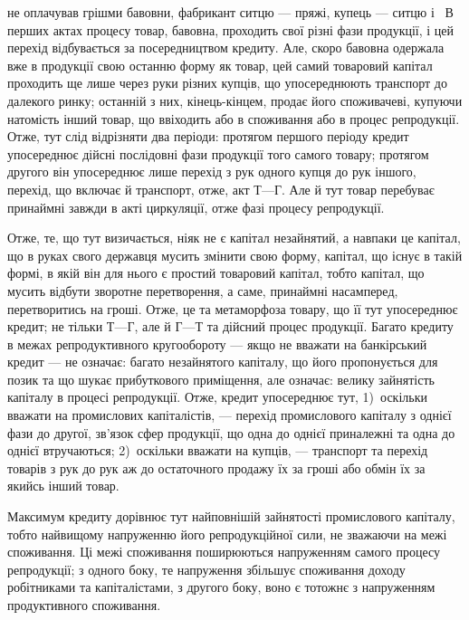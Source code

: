 \parcont{}  %
не оплачував грішми бавовни, фабрикант ситцю — пряжі, купець — ситцю і~
В перших актах процесу товар, бавовна, проходить свої різні фази продукції, і цей
перехід відбувається за посередництвом кредиту. Але, скоро бавовна одержала
вже в продукції свою останню форму як товар, цей самий товаровий капітал
проходить ще лише через руки різних купців, що упосереднюють транспорт до
далекого ринку; останній з них, кінець-кінцем, продає його споживачеві,
купуючи натомість інший товар, що ввіходить або в споживання або в процес
репродукції. Отже, тут слід відрізняти два періоди: протягом першого періоду
кредит упосереднює дійсні послідовні фази продукції того самого товару; протягом
другого він упосереднює лише перехід з рук одного купця до рук іншого, перехід,
що включає й транспорт, отже, акт $Т — Г$. Але й тут товар перебуває принаймні
завжди в акті циркуляції, отже фазі процесу репродукції.

Отже, те, що тут визичається, ніяк не є капітал незайнятий, а навпаки це
капітал, що в руках свого державця мусить змінити свою форму, капітал, що
існує в такій формі, в якій він для нього є простий товаровий капітал, тобто
капітал, що мусить відбути зворотне перетворення, а саме, принаймні насамперед,
перетворитись на гроші. Отже, це та метаморфоза товару, що її тут упосереднює
кредит; не тільки $Т — Г$, але й $Г — Т$ та дійсний процес продукції.
Багато кредиту в межах репродуктивного кругообороту — якщо не вважати на банкірський
кредит — не означає: багато незайнятого капіталу, що його пропонується
для позик та що шукає прибуткового приміщення, але означає: велику
зайнятість капіталу в процесі репродукції. Отже, кредит упосереднює тут,
1)~оскільки вважати на промислових капіталістів, — перехід промислового капіталу
з однієї фази до другої, зв’язок сфер продукції, що одна до однієї приналежні
та одна до однієї втручаються; 2)~оскільки вважати на купців, —
транспорт та перехід товарів з рук до рук аж до остаточного продажу їх за
гроші або обмін їх за якийсь інший товар.

Максимум кредиту дорівнює тут найповнішій зайнятості промислового капіталу,
тобто найвищому напруженню його репродукційної сили, не зважаючи на межі
споживання. Ці межі споживання поширюються напруженням самого процесу
репродукції; з одного боку, те напруження збільшує споживання доходу робітниками
та капіталістами, з другого боку, воно є тотожнє з напруженням продуктивного
споживання.

